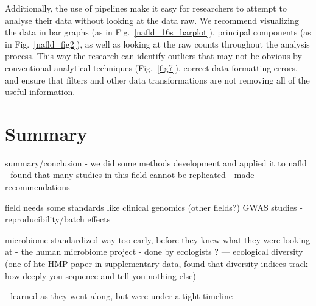 Additionally, the use of pipelines make it easy for researchers to attempt to analyse their data without looking at the data raw. We recommend visualizing the data in bar graphs (as in Fig.~\ref{nafld_16s_barplot}), principal components (as in Fig.~\ref{nafld_fig2}), as well as looking at the raw counts throughout the analysis process. This way the research can identify outliers that may not be obvious by conventional analytical techniques (Fig.~\ref{fig7}), correct data formatting errors, and ensure that filters and other data transformations are not removing all of the useful information.

\section{Summary}

summary/conclusion
- we did some methods development and applied it to nafld
- found that many studies in this field cannot be replicated
- made recommendations

field needs some standards like clinical genomics (other fields?)
GWAS studies - reproducibility/batch effects

microbiome standardized way too early, before they knew what they were looking at
- the human microbiome project
- done by ecologists ?
 — ecological diversity (one of hte HMP paper in supplementary data, found that diversity indices track how deeply you sequence and tell you nothing else)

- learned as they went along, but were under a tight timeline